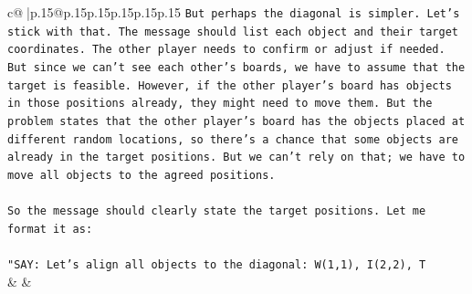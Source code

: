 \documentclass{article}
\begin{document}
{\begin{supertabular}{c@{$\;$}|p{.15\linewidth}@{}p{.15\linewidth}p{.15\linewidth}p{.15\linewidth}p{.15\linewidth}p{.15\linewidth}}
{{{\texttt{But perhaps the diagonal is simpler. Let's stick with that. The message should list each object and their target coordinates. The other player needs to confirm or adjust if needed. But since we can't see each other's boards, we have to assume that the target is feasible. However, if the other player's board has objects in those positions already, they might need to move them. But the problem states that the other player's board has the objects placed at different random locations, so there's a chance that some objects are already in the target positions. But we can't rely on that; we have to move all objects to the agreed positions.} \\
\\ 
\texttt{So the message should clearly state the target positions. Let me format it as:} \\
\\ 
\texttt{"SAY: Let's align all objects to the diagonal: W(1,1), I(2,2), T} \\
            }
        }
    }
    & & \\ \\


\end{supertabular}}
\end{document}
